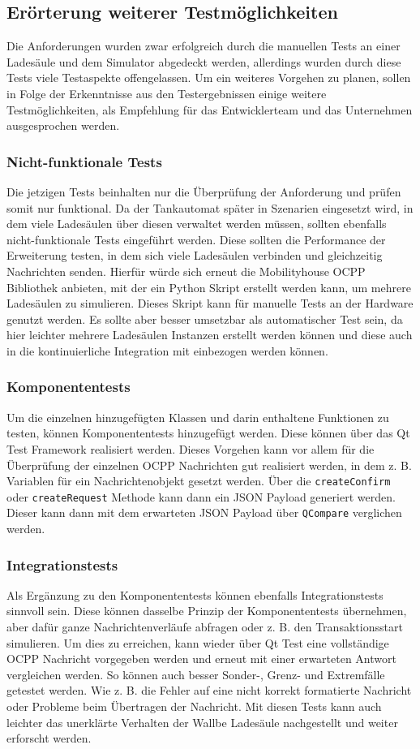 \subsection{Erörterung weiterer Testmöglichkeiten}\label{Testeröterung}
Die Anforderungen wurden zwar erfolgreich durch die manuellen Tests an einer Ladesäule und dem Simulator abgedeckt werden, allerdings wurden durch diese Tests viele Testaspekte offengelassen. Um ein weiteres Vorgehen zu planen, sollen in Folge der Erkenntnisse aus den Testergebnissen einige weitere Testmöglichkeiten, als Empfehlung für das Entwicklerteam und das Unternehmen ausgesprochen werden.
\subsubsection{Nicht-funktionale Tests}
Die jetzigen Tests beinhalten nur die Überprüfung der Anforderung und prüfen somit nur funktional. Da der Tankautomat später in Szenarien eingesetzt wird, in dem viele Ladesäulen über diesen verwaltet werden müssen, sollten ebenfalls nicht-funktionale Tests eingeführt werden. Diese sollten die Performance der Erweiterung testen, in dem sich viele Ladesäulen verbinden und gleichzeitig Nachrichten senden. Hierfür würde sich erneut die Mobilityhouse OCPP Bibliothek anbieten, mit der ein Python Skript erstellt werden kann, um mehrere Ladesäulen zu simulieren. Dieses Skript kann für manuelle Tests an der Hardware genutzt werden. Es sollte aber besser umsetzbar als automatischer Test sein, da hier leichter mehrere Ladesäulen Instanzen erstellt werden können und diese auch in die kontinuierliche Integration mit einbezogen werden können.
\subsubsection{Komponententests}
Um die einzelnen hinzugefügten Klassen und darin enthaltene Funktionen zu testen, können Komponententests hinzugefügt werden. Diese können über das Qt Test Framework realisiert werden. Dieses Vorgehen kann vor allem für die Überprüfung der einzelnen OCPP Nachrichten gut realisiert werden, in dem z. B. Variablen für ein Nachrichtenobjekt gesetzt werden. Über die \verb|createConfirm| oder \verb|createRequest| Methode kann dann ein JSON Payload generiert werden. Dieser kann dann mit dem erwarteten JSON Payload über \verb|QCompare| verglichen werden.
\subsubsection{Integrationstests}
Als Ergänzung zu den Komponententests können ebenfalls Integrationstests sinnvoll sein. Diese können dasselbe Prinzip der Komponententests übernehmen, aber dafür ganze Nachrichtenverläufe abfragen oder z. B. den Transaktionsstart simulieren. Um dies zu erreichen, kann wieder über Qt Test eine vollständige OCPP Nachricht vorgegeben werden und erneut mit einer erwarteten Antwort vergleichen werden. So können auch besser Sonder-, Grenz- und Extremfälle getestet werden. Wie z. B. die Fehler auf eine nicht korrekt formatierte Nachricht oder Probleme beim Übertragen der Nachricht. Mit diesen Tests kann auch leichter das unerklärte Verhalten der Wallbe Ladesäule nachgestellt und weiter erforscht werden. 
\newpage

